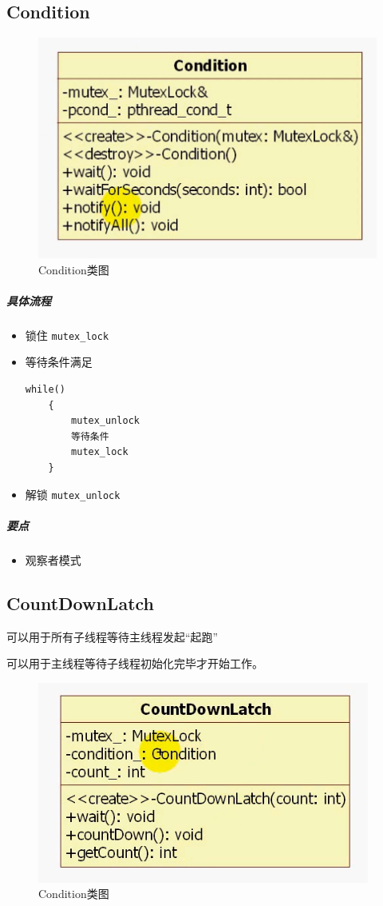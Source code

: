 \documentclass[UTF8,a4paper,8pt]{ctexbook}
\begin{document}
		\subsection{Condition}
			
			\begin{figure}[htbp]
				\centering
				\includegraphics[scale= 0.4]{figure/muduoCondition.png}
				\caption{Condition类图}
			\end{figure}
				
			
			\subparagraph{具体流程}
				\begin{itemize}[itemindent = 2em]
					\item 锁住 \verb|mutex_lock|
					\item 等待条件满足
						\begin{lstlisting}[frame=L]
	while()
	{
		mutex_unlock
		等待条件
		mutex_lock
	}
						\end{lstlisting}
					\item 解锁 \verb|mutex_unlock|
				\end{itemize}
				
			\subparagraph{要点}
				\begin{itemize}
					\item 观察者模式
				\end{itemize}
				
		
		\subsection{CountDownLatch}
				可以用于所有子线程等待主线程发起“起跑”
				
				可以用于主线程等待子线程初始化完毕才开始工作。
				
				\begin{figure}[htbp]
					\centering
					\includegraphics[scale= 0.4]{figure/muduoCountdownlatch.png}
					\caption{Condition类图}
				\end{figure}
		
\end{document}
